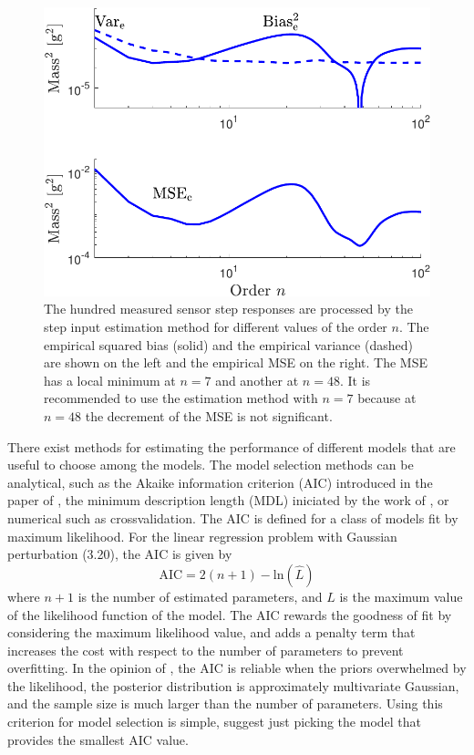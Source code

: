 \begin{figure}[!htbp]
\centering
\includegraphics[width=0.69\columnwidth]{./ChapterExperimentalValidation/fig/Fig_12.pdf} 
\caption{ \label{fig:msee_vs_n_exp} 
The hundred measured sensor step responses are processed by the step input estimation method for different values of the order $n$. 
The empirical squared bias (solid) and the empirical variance (dashed) are shown on the left and the empirical MSE on the right.
The MSE has a local minimum at $n=7$ and another at $n=48$.
It is recommended to use the estimation method with $n=7$ because at $n=48$ the decrement of the MSE is not significant.  }
\end{figure}

\color{blue}
	
	There exist methods for estimating the performance of different models that are useful to choose among the models.
	The model selection methods can be analytical, such as the Akaike information criterion (AIC) introduced in the paper of \citet{Akaike74}, the minimum description length (MDL) iniciated by the work of \citet{Rissanen78}, or numerical such as crossvalidation.
	The AIC is defined for a class of models fit by maximum likelihood. 
	For the linear regression problem with Gaussian perturbation (3.20), the AIC is given by
	\begin{equation} \mathrm{AIC} = 2 \left( n+1 \right) - \mathrm{ln} \left( \widehat{L} \right) \label{eqn:AIC} \end{equation}
	where $n+1$ is the number of estimated parameters, and $\widehat{L}$ is the maximum value of the likelihood function of the model.
	The AIC rewards the goodness of fit by considering the maximum likelihood value, and adds a penalty term that increases the cost with respect to the number of parameters to prevent overfitting.
	In the opinion of \citet{McElreath20}, the AIC is reliable when the priors overwhelmed by the likelihood, the posterior distribution is approximately multivariate Gaussian, and the sample size is much larger than the number of parameters.
	Using this criterion for model selection is simple, \citet{Hastie09} suggest just picking the model that provides the smallest AIC value.

